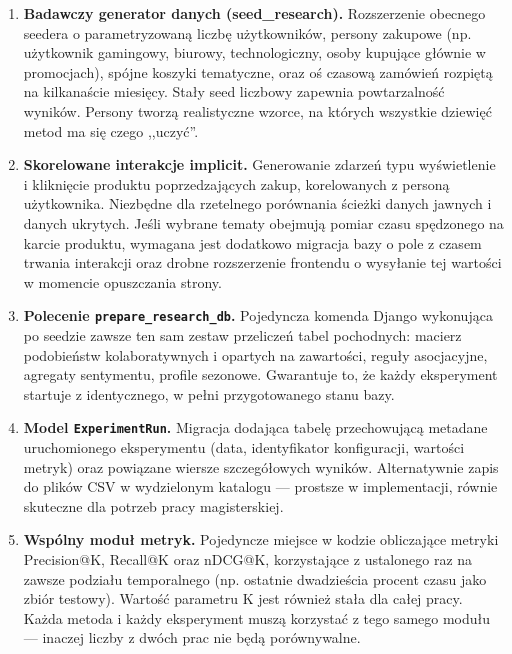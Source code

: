 \documentclass[12pt,a4paper]{article}
\begin{document}
\begin{enumerate}
\item \textbf{Badawczy generator danych (seed\_research).} Rozszerzenie obecnego seedera o parametryzowaną liczbę użytkowników, persony zakupowe (np. użytkownik gamingowy, biurowy, technologiczny, osoby kupujące głównie w promocjach), spójne koszyki tematyczne, oraz oś czasową zamówień rozpiętą na kilkanaście miesięcy. Stały seed liczbowy zapewnia powtarzalność wyników. Persony tworzą realistyczne wzorce, na których wszystkie dziewięć metod ma się czego ,,uczyć''.

\item \textbf{Skorelowane interakcje implicit.} Generowanie zdarzeń typu wyświetlenie i kliknięcie produktu poprzedzających zakup, korelowanych z personą użytkownika. Niezbędne dla rzetelnego porównania ścieżki danych jawnych i danych ukrytych. Jeśli wybrane tematy obejmują pomiar czasu spędzonego na karcie produktu, wymagana jest dodatkowo migracja bazy o pole z czasem trwania interakcji oraz drobne rozszerzenie frontendu o wysyłanie tej wartości w momencie opuszczania strony.

\item \textbf{Polecenie \texttt{prepare\_research\_db}.} Pojedyncza komenda Django wykonująca po seedzie zawsze ten sam zestaw przeliczeń tabel pochodnych: macierz podobieństw kolaboratywnych i opartych na zawartości, reguły asocjacyjne, agregaty sentymentu, profile sezonowe. Gwarantuje to, że każdy eksperyment startuje z identycznego, w pełni przygotowanego stanu bazy.

\item \textbf{Model \texttt{ExperimentRun}.} Migracja dodająca tabelę przechowującą metadane uruchomionego eksperymentu (data, identyfikator konfiguracji, wartości metryk) oraz powiązane wiersze szczegółowych wyników. Alternatywnie zapis do plików CSV w wydzielonym katalogu --- prostsze w implementacji, równie skuteczne dla potrzeb pracy magisterskiej.

\item \textbf{Wspólny moduł metryk.} Pojedyncze miejsce w kodzie obliczające metryki Precision@K, Recall@K oraz nDCG@K, korzystające z ustalonego raz na zawsze podziału temporalnego (np. ostatnie dwadzieścia procent czasu jako zbiór testowy). Wartość parametru K jest również stała dla całej pracy. Każda metoda i każdy eksperyment muszą korzystać z tego samego modułu --- inaczej liczby z dwóch prac nie będą porównywalne.
\end{enumerate}
\end{document}
